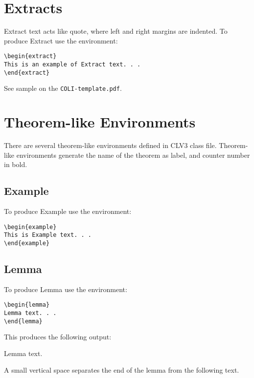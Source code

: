 \documentclass{clv3}
\begin{document}
\section{Extracts}

Extract text acts like quote, where left and right margins are indented.
To produce Extract use the environment:

\begin{verbatim}
\begin{extract}
This is an example of Extract text. . .
\end{extract}
\end{verbatim}

\noindent See sample on the {\tt COLI-template.pdf}.

\section{Theorem-like Environments}

There are several theorem-like environments defined in CLV3 class file. Theorem-like
environments generate the name of the theorem as label, and counter number in bold.

\subsection{Example}

To produce Example use the environment:

\begin{verbatim}
\begin{example}
This is Example text. . .
\end{example}
\end{verbatim}

\subsection{Lemma}

To produce Lemma use the environment:

\begin{verbatim}
\begin{lemma}
Lemma text. . .
\end{lemma}
\end{verbatim}

This produces the following output:
\begin{lemma}\label{lem}
Lemma text.
\end{lemma}
A small vertical space separates the end of the lemma
from the following text.
\end{document}
